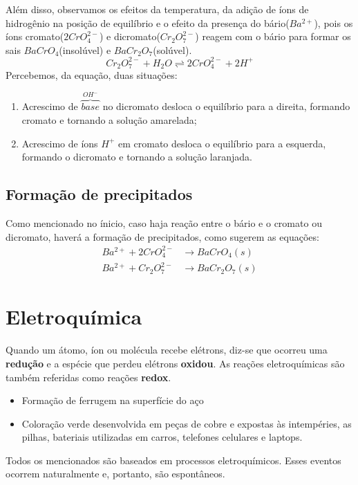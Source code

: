 \documentclass{article}
\begin{document}
Além disso, observamos os efeitos da temperatura, da adição de íons de hidrogênio na posição de equilíbrio e o efeito da presença do bário($Ba^{2+}$), pois os íons cromato($2CrO_4^{2-}$) e dicromato($Cr_2O_7^{2-}$) reagem com o bário para formar os sais $BaCrO_4$(insolúvel) e $BaCr_2O_7$(solúvel).
\begin{equation}
  Cr_2O_7^{2-}+H_2O\rightleftharpoons 2CrO_4^{2-}+2H^{+}
\end{equation}
Percebemos, da equação, duas situações:
\begin{enumerate}
  \item Acrescimo de $\overbrace{base}^{\text{$OH^-$}}$ no dicromato desloca o equilíbrio para a direita, formando cromato e tornando a solução amarelada;
  \item Acrescimo de íons $H^+$ em cromato desloca o equilíbrio para a esquerda, formando o dicromato e tornando a solução laranjada.
\end{enumerate}
\subsection{Formação de precipitados}
Como mencionado no ínicio, caso haja reação entre o bário e o cromato ou dicromato, haverá a formação de precipitados, como sugerem as equações:
\begin{align}
  Ba^{2+}+2CrO_4^{2-}&\rightarrow BaCrO_4(s)\\
  Ba^{2+}+Cr_2O_7^{2-}&\rightarrow BaCr_2O_7(s)
\end{align}

\section{Eletroquímica}
Quando um átomo, íon ou molécula recebe elétrons, diz-se que ocorreu uma \textbf{redução} e a espécie que perdeu elétrons \textbf{oxidou}. As reações eletroquímicas são também referidas como reações \textbf{redox}.
\begin{itemize}
  \item Formação de ferrugem na superfície do aço
  \item Coloração verde desenvolvida em peças de cobre e expostas às intempéries, as pilhas, bateriais utilizadas em carros, telefones celulares e laptops.
\end{itemize}
Todos os mencionados são baseados em processos eletroquímicos. Esses eventos ocorrem naturalmente e, portanto, são espontâneos.
\end{document}
